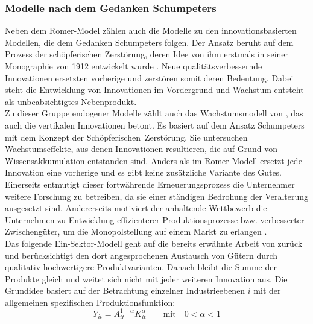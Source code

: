 \subsubsection*{Modelle nach dem Gedanken Schumpeters}\label{sec:schumpeter}
Neben dem Romer-Model zählen auch die Modelle zu den innovationsbasierten Modellen, die dem Gedanken Schumpeters folgen. Der Ansatz beruht auf dem Prozess der schöpferischen Zerstörung, deren Idee von ihm erstmals in seiner Monographie von 1912 entwickelt wurde \cite{Schumpeter.1934}. Neue qualitätsverbessernde Innovationen ersetzten vorherige und zerstören somit deren Bedeutung. Dabei steht die Entwicklung von Innovationen im Vordergrund und Wachstum entsteht als unbeabsichtigtes Nebenprodukt.\\
%
Zu dieser Gruppe endogener Modelle zählt auch das Wachstumsmodell von \cite{Aghion.1992}, das auch die vertikalen Innovationen betont. Es basiert auf dem Ansatz Schumpeters mit dem Konzept der Schöpferischen~Zerstörung. Sie untersuchen Wachstumseffekte, aus denen Innovationen resultieren, die auf Grund von Wissensakkumulation entstanden sind. Anders als im Romer-Modell ersetzt jede Innovation eine vorherige und es gibt keine zusätzliche Variante des Gutes. Einerseits entmutigt dieser fortwährende Erneuerungsprozess die Unternehmer weitere Forschung zu betreiben, da sie einer ständigen Bedrohung der Veralterung ausgesetzt sind. Andererseits motiviert der anhaltende Wettbewerb die Unternehmen zu Entwicklung effizienterer Produktionsprozesse bzw. verbesserter Zwischengüter, um die Monopolstellung auf einem Markt zu erlangen \cite{Aghion.1992}.\\ 
%
Das folgende Ein-Sektor-Modell geht auf die bereits erwähnte Arbeit von \cite{Aghion.1992,Aghion.1998} zurück und berücksichtigt den dort angesprochenen Austausch von Gütern durch qualitativ hochwertigere Produktvarianten. Danach bleibt die Summe der Produkte gleich und weitet sich nicht mit jeder weiteren Innovation aus. Die Grundidee basiert auf der Betrachtung einzelner Industrieebenen $i$ mit der allgemeinen spezifischen Produktionsfunktion:
%
	\begin{equation}
		Y_{it}=A_{it}^{1-\alpha}K_{it}^\alpha \qquad \text{mit}\quad 0 < \alpha < 1 \label{Produktionsfunktion Industrien Schumpeter}
	\end{equation}
%
